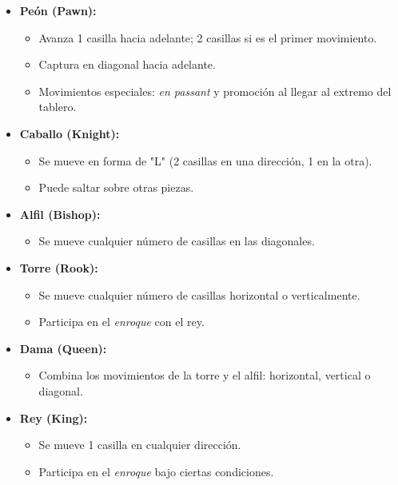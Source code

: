 \begin{itemize}
    \item \textbf{Peón (Pawn):}
    \begin{itemize}
        \item Avanza 1 casilla hacia adelante; 2 casillas si es el primer movimiento.
        \item Captura en diagonal hacia adelante.
        \item Movimientos especiales: \emph{en passant} y promoción al llegar al extremo del tablero.
    \end{itemize}

    \item \textbf{Caballo (Knight):}
    \begin{itemize}
        \item Se mueve en forma de "L" (2 casillas en una dirección, 1 en la otra).
        \item Puede saltar sobre otras piezas.
    \end{itemize}

    \item \textbf{Alfil (Bishop):}
    \begin{itemize}
        \item Se mueve cualquier número de casillas en las diagonales.
    \end{itemize}

    \item \textbf{Torre (Rook):}
    \begin{itemize}
        \item Se mueve cualquier número de casillas horizontal o verticalmente.
        \item Participa en el \emph{enroque} con el rey.
    \end{itemize}

    \item \textbf{Dama (Queen):}
    \begin{itemize}
        \item Combina los movimientos de la torre y el alfil: horizontal, vertical o diagonal.
    \end{itemize}

    \item \textbf{Rey (King):}
    \begin{itemize}
        \item Se mueve 1 casilla en cualquier dirección.
        \item Participa en el \emph{enroque} bajo ciertas condiciones.
    \end{itemize}
\end{itemize}


